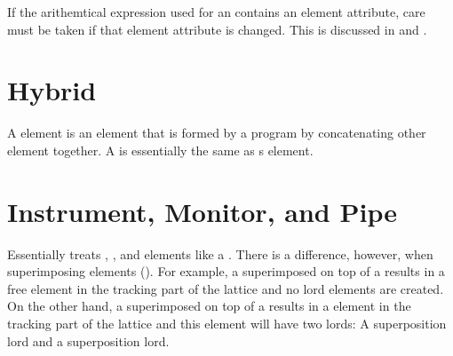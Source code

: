 If the arithemtical expression used for an  contains an element attribute,
care must be taken if that element attribute is changed. This is discussed in
 and .

\section{Hybrid}
\label{s:hybrid}

A  element is an element that is formed by a program by concatenating other element
together. A  is essentially the same as s  element.

\section{Instrument, Monitor, and Pipe}
\label{s:monitor}

Essentially \bmad treats , , and 
elements like a . There is a difference, however, when
superimposing elements (). For example, a
 superimposed on top of a  results in a free
 element in the tracking part of the lattice and no
lord elements are created. On the other hand, a 
superimposed on top of a  results in a 
element in the tracking part of the lattice and this 
element will have two lords: A  superposition lord and
a  superposition lord.

